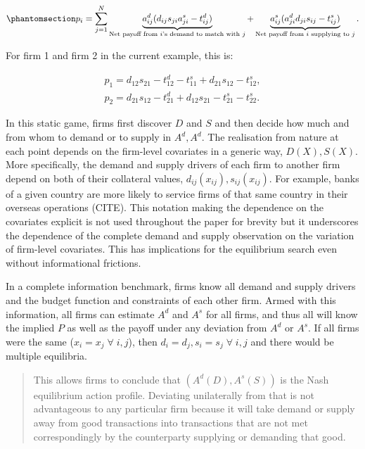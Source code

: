 \documentclass[
]{article}
\theoremstyle{definition}
\theoremstyle{plain}
\theoremstyle{remark}
\begin{document}
\begin{equation}\phantomsection\label{eq-firmlevelpayoff}{
p_i = \sum_{j=1}^N \underbrace{a_{ij}^d (d_{ij} s_{ji} a_{ji}^s - t_{ij}^d)}_{\text{Net payoff from $i$'s demand to match with $j$}} + \underbrace{a_{ij}^s (a_{ji}^d d_{ji} s_{ij} - t_{ij}^s)}_{\text{Net payoff from $i$ supplying to $j$}}.
}\end{equation}

For firm 1 and firm 2 in the current example, this is:

\[
\begin{split}
p_1 = d_{12} s_{21} - t_{12}^d - t_{11}^s + d_{21} s_{12} - t_{12}^s, \\
p_2 = d_{21} s_{12} -t_{21}^d + d_{12} s_{21} - t_{21}^s - t_{22}^s.
\end{split}
\]

In this static game, firms first discover \(D\) and \(S\) and then
decide how much and from whom to demand or to supply in \(A^d, A^d\).
The realisation from nature at each point depends on the firm-level
covariates in a generic way, \(D(X), S(X)\). More specifically, the
demand and supply drivers of each firm to another firm depend on both of
their collateral values, \(d_{ij}(x_{ij}), s_{ij}(x_{ij})\). For
example, banks of a given country are more likely to service firms of
that same country in their overseas operations (CITE). This notation
making the dependence on the covariates explicit is not used throughout
the paper for brevity but it underscores the dependence of the complete
demand and supply observation on the variation of firm-level covariates.
This has implications for the equilibrium search even without
informational frictions.

In a complete information benchmark, firms know all demand and supply
drivers and the budget function and constraints of each other firm.
Armed with this information, all firms can estimate \(A^d\) and \(A^s\)
for all firms, and thus all will know the implied \(P\) as well as the
payoff under any deviation from \(A^d\) or \(A^s\). If all firms were
the same (\(x_i = x_j \; \forall \; i, j\)), then
\(d_i = d_j, s_i = s_j \; \forall \; i, j\) and there would be multiple
equilibria.

\begin{quote}
This allows firms to conclude that \((A^d(D), A^s(S))\) is the Nash
equilibrium action profile. Deviating unilaterally from that is not
advantageous to any particular firm because it will take demand or
supply away from good transactions into transactions that are not met
correspondingly by the counterparty supplying or demanding that good.
\end{quote}
\end{document}
